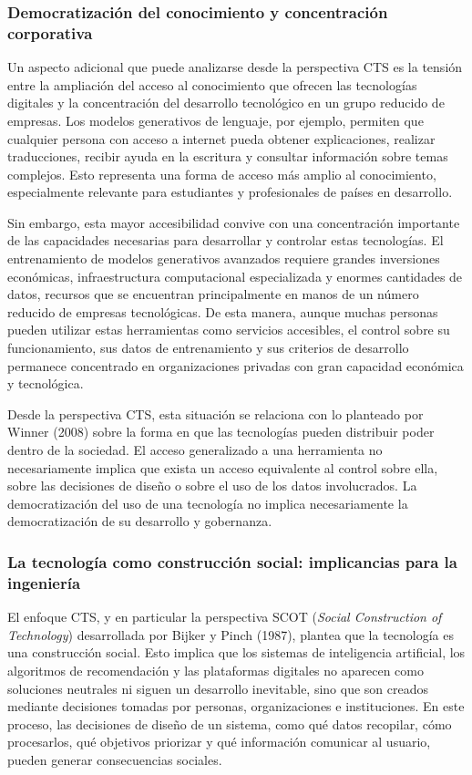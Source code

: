 \documentclass[11pt,a4paper]{article}
\begin{document}
\subsubsection{Democratización del conocimiento y concentración corporativa}

Un aspecto adicional que puede analizarse desde la perspectiva CTS es la tensión entre la ampliación del acceso al conocimiento que ofrecen las tecnologías digitales y la concentración del desarrollo tecnológico en un grupo reducido de empresas. Los modelos generativos de lenguaje, por ejemplo, permiten que cualquier persona con acceso a internet pueda obtener explicaciones, realizar traducciones, recibir ayuda en la escritura y consultar información sobre temas complejos. Esto representa una forma de acceso más amplio al conocimiento, especialmente relevante para estudiantes y profesionales de países en desarrollo.

Sin embargo, esta mayor accesibilidad convive con una concentración importante de las capacidades necesarias para desarrollar y controlar estas tecnologías. El entrenamiento de modelos generativos avanzados requiere grandes inversiones económicas, infraestructura computacional especializada y enormes cantidades de datos, recursos que se encuentran principalmente en manos de un número reducido de empresas tecnológicas. De esta manera, aunque muchas personas pueden utilizar estas herramientas como servicios accesibles, el control sobre su funcionamiento, sus datos de entrenamiento y sus criterios de desarrollo permanece concentrado en organizaciones privadas con gran capacidad económica y tecnológica.

Desde la perspectiva CTS, esta situación se relaciona con lo planteado por Winner (2008) sobre la forma en que las tecnologías pueden distribuir poder dentro de la sociedad. El acceso generalizado a una herramienta no necesariamente implica que exista un acceso equivalente al control sobre ella, sobre las decisiones de diseño o sobre el uso de los datos involucrados. La democratización del uso de una tecnología no implica necesariamente la democratización de su desarrollo y gobernanza.

\subsubsection{La tecnología como construcción social: implicancias para la ingeniería}

El enfoque CTS, y en particular la perspectiva SCOT (\textit{Social Construction of Technology}) desarrollada por Bijker y Pinch (1987), plantea que la tecnología es una construcción social. Esto implica que los sistemas de inteligencia artificial, los algoritmos de recomendación y las plataformas digitales no aparecen como soluciones neutrales ni siguen un desarrollo inevitable, sino que son creados mediante decisiones tomadas por personas, organizaciones e instituciones. En este proceso, las decisiones de diseño de un sistema, como qué datos recopilar, cómo procesarlos, qué objetivos priorizar y qué información comunicar al usuario, pueden generar consecuencias sociales.
\end{document}
